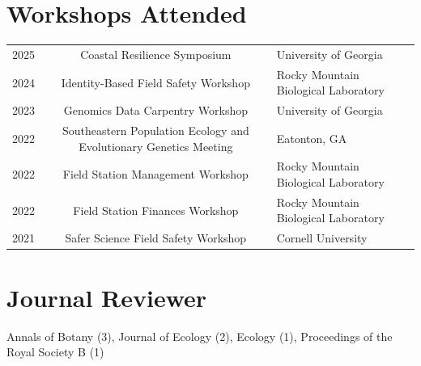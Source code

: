 \documentclass[letterpaper, 11pt]{article}
\begin{document}
\section*{Workshops Attended}
\begin{tabular}{Y C L}
2025 & Coastal Resilience Symposium & University of Georgia \\
2024 & Identity-Based Field Safety Workshop & Rocky Mountain Biological Laboratory \\
2023 & Genomics Data Carpentry Workshop & University of Georgia \\
2022 & Southeastern Population Ecology and Evolutionary Genetics Meeting & Eatonton, GA \\
2022 & Field Station Management Workshop & Rocky Mountain Biological Laboratory \\
2022 & Field Station Finances Workshop & Rocky Mountain Biological Laboratory \\
2021 & Safer Science Field Safety Workshop & Cornell University \\
\end{tabular}
\section*{Journal Reviewer}
Annals of Botany (3), Journal of Ecology (2), Ecology (1), Proceedings of the Royal Society B (1)
\end{document}

